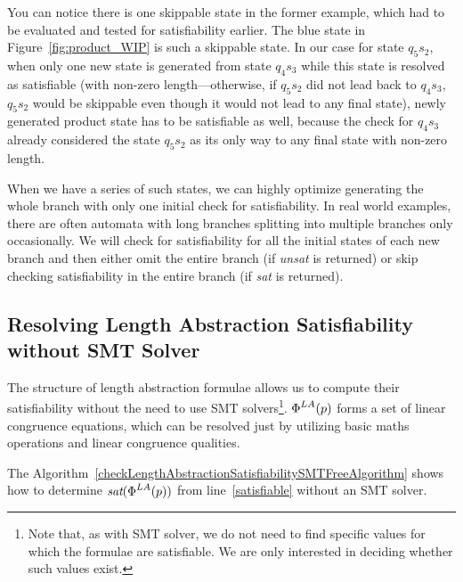 You can notice there is one skippable state in the former example, which had to be evaluated and tested for satisfiability earlier. The blue state in Figure~\ref{fig:product_WIP} is such a skippable state. In our case for state $q_5s_2$, when only one new state is generated from state $q_4s_3$ while this state is resolved as satisfiable (with non-zero length---otherwise, if $q_5s_2$ did not lead back to $q_4s_3$, $q_5s_2$ would be skippable even though it would not lead to any final state), newly generated product state has to be satisfiable as well, because the check for $q_4s_3$ already considered the state $q_5s_2$ as its only way to any final state with non-zero length.

When we have a series of such states, we can highly optimize generating the whole branch with only one initial check for satisfiability. In real world examples, there are often automata with long branches splitting into multiple branches only occasionally. We will check for satisfiability for all the initial states of each new branch and then either omit the entire branch (if \emph{unsat} is returned) or skip checking satisfiability in the entire branch (if \emph{sat} is returned).

\subsection{Resolving Length Abstraction Satisfiability without SMT Solver}

The structure of length abstraction formulae allows us to compute their satisfiability without the need to use SMT solvers\footnote{Note that, as with SMT solver, we do not need to find specific values for which the formulae are satisfiable. We are only interested in deciding whether such values exist.}. $\emph{$\Phi$}^{LA}(p)$ forms a set of linear congruence equations, which can be resolved just by utilizing basic maths operations and linear congruence qualities.

The Algorithm~\ref{checkLengthAbstractionSatisfiabilitySMTFreeAlgorithm} shows how to determine $\emph{sat}(\emph{$\Phi$}^{LA}(p))$ from line~\ref{satisfiable} without an SMT solver.



